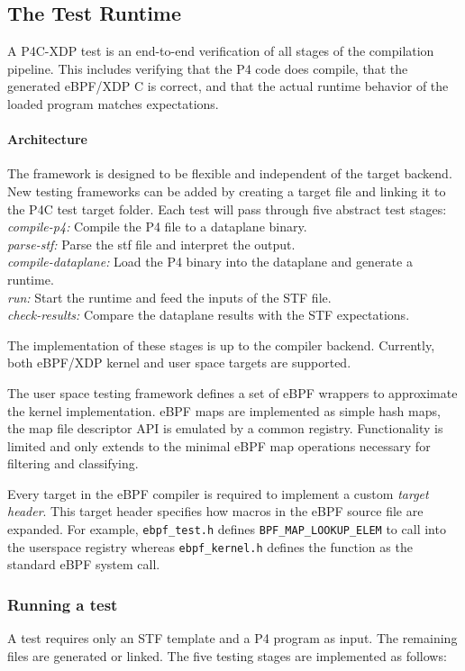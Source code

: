 \subsection{The Test Runtime}
A P4C-XDP test is an end-to-end verification of all stages of 
the compilation pipeline. This includes verifying that the P4 code does 
compile, that the generated eBPF/XDP C is correct, and that the actual runtime 
behavior of the loaded program matches expectations.

\paragraph{Architecture}
The framework is designed to be flexible and independent of the target 
backend. New testing frameworks can be added by creating a target file 
and linking it to the P4C test target folder. Each test will pass through five 
abstract test stages:\\
\textit{compile-p4:} Compile the P4 file to a dataplane binary. \\
\textit{parse-stf:} Parse the stf file and interpret the output. \\
\textit{compile-dataplane:} Load the P4 binary into the dataplane and generate 
a runtime.\\
\textit{run:} Start the runtime and feed the inputs of the STF file.\\
\textit{check-results:} Compare the dataplane results with the STF expectations.

The implementation of these stages is up to the compiler backend.
Currently, both eBPF/XDP kernel and user space targets are supported.

The user space testing framework defines a set of eBPF wrappers to approximate 
the kernel implementation. eBPF maps are implemented as simple hash maps, the 
map file descriptor API is emulated by a common registry. Functionality is 
limited and only extends to the minimal eBPF map operations necessary for 
filtering and classifying.

Every target in the eBPF compiler is required to implement a custom 
\textit{target header}. This target header specifies how macros in the eBPF 
source file are expanded. For example, \texttt{ebpf\_test.h} defines 
\texttt{BPF\_MAP\_LOOKUP\_ELEM} to call into the userspace registry whereas 
\texttt{ebpf\_kernel.h} defines the function as the standard eBPF system call.

\subsubsection{Running a test}
A test requires only an STF template and a P4 program as input. The 
remaining files are generated or linked. The five testing stages are 
implemented as follows:
